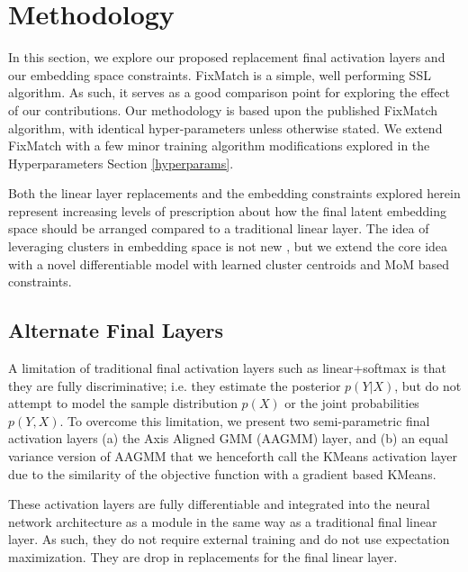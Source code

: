 \documentclass[10pt,twocolumn,letterpaper]{article}
\begin{document}

\section{Methodology}

In this section, we explore our proposed replacement final activation layers and our embedding space constraints.
FixMatch \cite{sohn2020fixmatch} is a simple, well performing SSL algorithm.
As such, it serves as a good comparison point for exploring the effect of our contributions.
Our methodology is based upon the published FixMatch \cite{sohn2020fixmatch} algorithm, with identical hyper-parameters unless otherwise stated.
We extend FixMatch with a few minor training algorithm modifications explored in the Hyperparameters Section \ref{hyperparams}.

Both the linear layer replacements and the embedding constraints explored herein represent increasing levels of prescription about how the final latent embedding space should be arranged compared to a traditional linear layer.
The idea of leveraging clusters in embedding space is not new \cite{caron2018deep,caron2020unsupervised,enguehard2019semi}, but we extend the core idea with a novel differentiable model with learned cluster centroids and MoM based constraints.

\subsection{Alternate Final Layers}

A limitation of traditional final activation layers such as linear+softmax is that they are fully discriminative; i.e. they estimate the posterior $p(Y|X)$, but do not attempt to model the sample distribution $p(X)$ or the joint probabilities $p(Y,X)$. 
To overcome this limitation, we present two semi-parametric final activation layers (a) the Axis Aligned GMM (AAGMM) layer, and (b) an equal variance version of AAGMM that we henceforth call the KMeans activation layer due to the similarity of the objective function with a gradient based KMeans.

These activation layers are fully differentiable and integrated into the neural network architecture as a module in the same way as a traditional final linear layer. 
As such, they do not require external training and do not use expectation maximization.
They are drop in replacements for the final linear layer.
\end{document}
